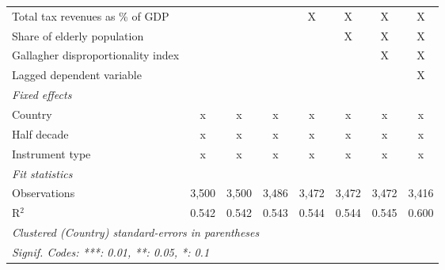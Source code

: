\begin{table}[htbp]
\begin{tabular}{lccccccc}
      Total tax revenues as \% of GDP                                  &                &                &                & X              & X              & X              & X\\  
      Share of elderly population                                      &                &                &                &                & X              & X              & X\\  
      Gallagher disproportionality index                               &                &                &                &                &                & X              & X\\  
      Lagged dependent variable                                        &                &                &                &                &                &                & X\\  
      \emph{Fixed effects}\\
      Country                                                          & x              & x              & x              & x              & x              & x              & x\\  
      Half decade                                                      & x              & x              & x              & x              & x              & x              & x\\  
      Instrument type                                                  & x              & x              & x              & x              & x              & x              & x\\  
      \midrule \emph{Fit statistics}\\
      Observations                                                     & 3,500          & 3,500          & 3,486          & 3,472          & 3,472          & 3,472          & 3,416\\  
      R$^2$                                                            & 0.542          & 0.542          & 0.543          & 0.544          & 0.544          & 0.545          & 0.600\\  
      \midrule
      \multicolumn{8}{l}{\emph{Clustered (Country) standard-errors in parentheses}}\\
      \multicolumn{8}{l}{\emph{Signif. Codes: ***: 0.01, **: 0.05, *: 0.1}}\\
   \end{tabular}
\end{table}



